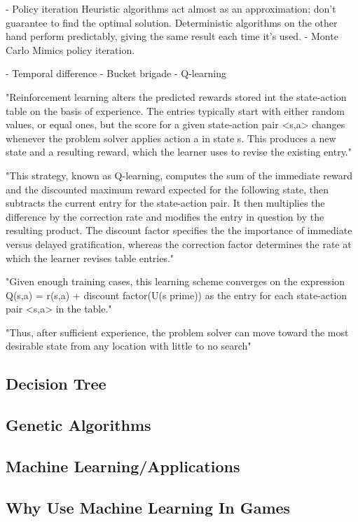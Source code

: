 \documentclass[a4paper,oneside]{report}
\begin{document}
- Policy iteration
Heuristic algorithms act almost as an approximation; don't guarantee to find the optimal solution. Deterministic algorithms on the other hand perform predictably, giving the same result each time it's used. 
- Monte Carlo
Mimics policy iteration. 

- Temporal difference
- Bucket brigade
- Q-learning

"Reinforcement learning alters the predicted rewards stored int the state-action table on the basis of experience. The entries typically start with either random values, or equal ones, but the score for a given state-action pair <s,a> changes whenever the problem solver applies action a in state s. This produces a new state and a resulting reward, which the learner uses to revise the existing entry."

"This strategy, known as Q-learning, computes the sum of the immediate reward and the discounted maximum reward expected for the following state, then subtracts the current entry for the state-action pair. It then multiplies the difference by the correction rate and modifies the entry in question by the resulting product. The discount factor specifies the the importance of immediate versus delayed gratification, whereas the correction factor determines the rate at which the learner revises table entries."

"Given enough training cases, this learning scheme converges on the expression Q(s,a) = r(s,a) + discount factor(U(s prime)) as the entry for each state-action pair <s,a> in the table."

"Thus, after sufficient experience, the problem solver can move toward the most desirable state from any location with little to no search"

\subsection{Decision Tree}

\subsection{Genetic Algorithms}

\subsection{Machine Learning/Applications}

\subsection{Why Use Machine Learning In Games}
\end{document}
